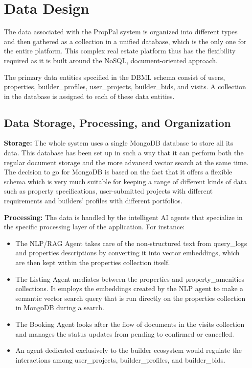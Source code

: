 \section{Data Design}

The data associated with the PropPal system is organized into different types and then gathered as a collection in a unified database, which is the only one for the entire platform. This complex real estate platform thus has the flexibility required as it is built around the NoSQL, document-oriented approach.

The primary data entities specified in the DBML schema consist of users, properties, builder\_profiles, user\_projects, builder\_bids, and visits. A collection in the database is assigned to each of these data entities.

\subsection{Data Storage, Processing, and Organization}

\textbf{Storage:} The whole system uses a single MongoDB database to store all its data. This database has been set up in such a way that it can perform both the regular document storage and the more advanced vector search at the same time. The decision to go for MongoDB is based on the fact that it offers a flexible schema which is very much suitable for keeping a range of different kinds of data such as property specifications, user-submitted projects with different requirements and builders' profiles with different portfolios.

\textbf{Processing:} The data is handled by the intelligent AI agents that specialize in the specific processing layer of the application. For instance:

\begin{itemize}
    \item The NLP/RAG Agent takes care of the non-structured text from query\_logs and properties descriptions by converting it into vector embeddings, which are then kept within the properties collection itself.
    \item The Listing Agent mediates between the properties and property\_amenities collections. It employs the embeddings created by the NLP agent to make a semantic vector search query that is run directly on the properties collection in MongoDB during a search.
    \item The Booking Agent looks after the flow of documents in the visits collection and manages the status updates from pending to confirmed or cancelled.
    \item An agent dedicated exclusively to the builder ecosystem would regulate the interactions among user\_projects, builder\_profiles, and builder\_bids.
\end{itemize}

